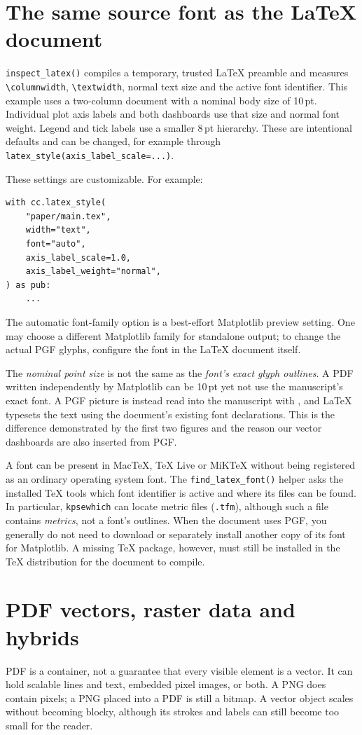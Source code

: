 \documentclass[10pt,twocolumn,a4paper]{article}
\begin{document}
\section{The same source font as the LaTeX document}
\texttt{inspect\_latex()} compiles a temporary,
trusted LaTeX preamble and measures
\verb|\columnwidth|, \verb|\textwidth|,
normal text size and the active font identifier.
This example uses a two-column document with a
nominal body size of 10\,pt. Individual plot axis
labels and both dashboards use that size and normal
font weight. Legend and tick labels use a smaller
8\,pt hierarchy. These are intentional defaults
and can be changed, for example through
\texttt{latex\_style(axis\_label\_scale=...)}.

These settings are customizable. For example:
\begin{verbatim}
with cc.latex_style(
    "paper/main.tex",
    width="text",
    font="auto",
    axis_label_scale=1.0,
    axis_label_weight="normal",
) as pub:
    ...
\end{verbatim}
The automatic font-family option is a best-effort
Matplotlib preview setting. One may choose a
different Matplotlib family for standalone output;
to change the actual PGF glyphs, configure the
font in the LaTeX document itself.

The \emph{nominal point size} is not the same as the
\emph{font's exact glyph outlines}. A PDF written
independently by Matplotlib can be 10\,pt yet not
use the manuscript's exact font. A PGF picture
is instead read into the manuscript with
\verb||, and LaTeX typesets the text using
the document's existing font declarations.
This is the difference demonstrated by the first
two figures and the reason our vector dashboards
are also inserted from PGF.

A font can be present in MacTeX, TeX Live or MiKTeX
without being registered as an ordinary operating
system font. The \texttt{find\_latex\_font()} helper
asks the installed TeX tools which font identifier
is active and where its files can be found. In
particular, \texttt{kpsewhich} can locate metric
files (\texttt{.tfm}), although such a file
contains \emph{metrics}, not a font's outlines.
When the document uses PGF, you generally do not
need to download or separately install another copy
of its font for Matplotlib. A missing TeX package,
however, must still be installed in the TeX
distribution for the document to compile.

\section{PDF vectors, raster data and hybrids}
PDF is a container, not a guarantee that every
visible element is a vector. It can hold scalable
lines and text, embedded pixel images, or both.
A PNG does contain pixels; a PNG placed into a
PDF is still a bitmap. A vector object scales
without becoming blocky, although its strokes and
labels can still become too small for the reader.
\end{document}
